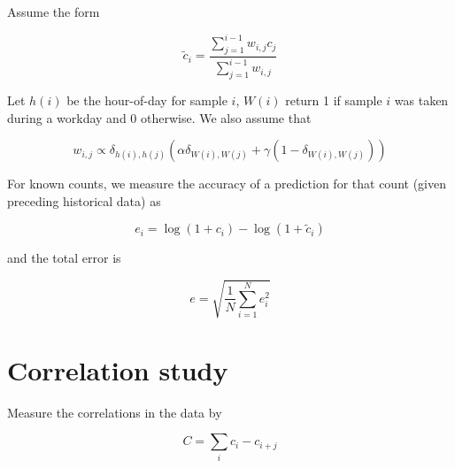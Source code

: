 \documentclass{article}
\begin{document}
Assume the form

\[
\tilde{c}_i = \frac{\sum_{j=1}^{i-1} w_{i,j} c_j}{\sum_{j=1}^{i-1}
w_{i,j}}
\]


Let $h(i)$ be the hour-of-day for sample $i$, $W(i)$ return 1 if
sample $i$ was taken during a workday and 0 otherwise. We also assume that

\[
w_{i,j} \propto \delta_{h(i),h(j)} (\alpha \delta_{W(i),W(j)} + \gamma (1 - \delta_{W(i),W(j)}))
\]

For known counts, we measure the accuracy of a prediction for that
count (given preceding historical data) as

\[
e_i = \log(1 + c_i) - \log(1 + \tilde{c}_i)
\]

and the total error is

\[
e = \sqrt{\frac{1}{N} \sum_{i=1}^N e_i^2}
\]


\section*{Correlation study}

Measure the correlations in the data by

\[
C = \sum_i c_i - c_{i+j}
\]
\end{document}
